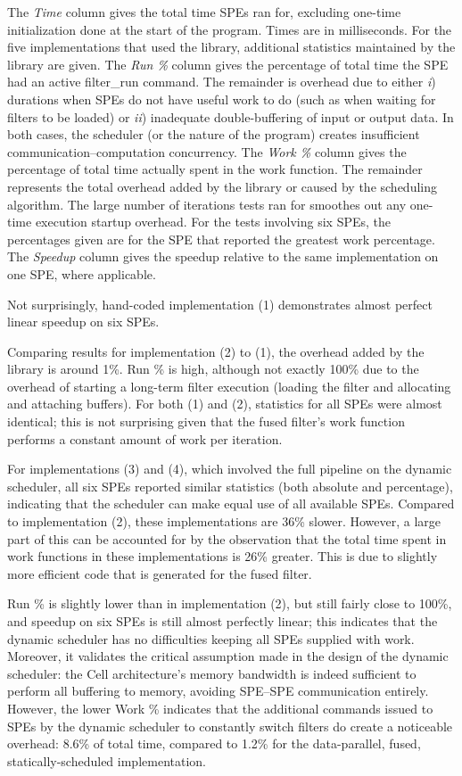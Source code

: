 The \emph{Time} column gives the total time SPEs ran for, excluding one-time initialization done at the start of the program. Times are in milliseconds. For the five implementations that used the library, additional statistics maintained by the library are given. The \emph{Run \%} column gives the percentage of total time the SPE had an active \textsf{filter\_run} command. The remainder is overhead due to either \emph{i}) durations when SPEs do not have useful work to do (such as when waiting for filters to be loaded) or \emph{ii}) inadequate double-buffering of input or output data. In both cases, the scheduler (or the nature of the program) creates insufficient communication--computation concurrency. The \emph{Work \%} column gives the percentage of total time actually spent in the work function. The remainder represents the total overhead added by the library or caused by the scheduling algorithm. The large number of iterations tests ran for smoothes out any one-time execution startup overhead. For the tests involving six SPEs, the percentages given are for the SPE that reported the greatest work percentage. The \emph{Speedup} column gives the speedup relative to the same implementation on one SPE, where applicable.

Not surprisingly, hand-coded implementation \textsf{(1)} demonstrates almost perfect linear speedup on six SPEs.

Comparing results for implementation \textsf{(2)} to \textsf{(1)}, the overhead added by the library is around 1\%. Run \% is high, although not exactly 100\% due to the overhead of starting a long-term filter execution (loading the filter and allocating and attaching buffers). For both \textsf{(1)} and \textsf{(2)}, statistics for all SPEs were almost identical; this is not surprising given that the fused filter's work function performs a constant amount of work per iteration.

For implementations \textsf{(3)} and \textsf{(4)}, which involved the full pipeline on the dynamic scheduler, all six SPEs reported similar statistics (both absolute and percentage), indicating that the scheduler can make equal use of all available SPEs. Compared to implementation \textsf{(2)}, these implementations are 36\% slower. However, a large part of this can be accounted for by the observation that the total time spent in work functions in these implementations is 26\% greater. This is due to slightly more efficient code that is generated for the fused filter.

Run \% is slightly lower than in implementation \textsf{(2)}, but still fairly close to 100\%, and speedup on six SPEs is still almost perfectly linear; this indicates that the dynamic scheduler has no difficulties keeping all SPEs supplied with work. Moreover, it validates the critical assumption made in the design of the dynamic scheduler: the Cell architecture's memory bandwidth is indeed sufficient to perform all buffering to memory, avoiding SPE--SPE communication entirely. However, the lower Work \% indicates that the additional commands issued to SPEs by the dynamic scheduler to constantly switch filters do create a noticeable overhead: 8.6\% of total time, compared to 1.2\% for the data-parallel, fused, statically-scheduled implementation.

